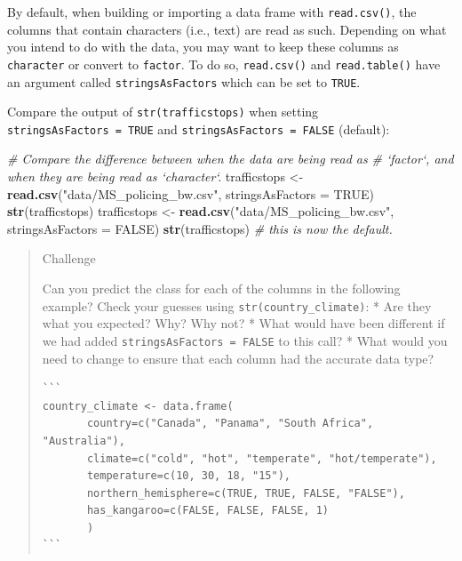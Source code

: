 \documentclass[
]{book}
\newenvironment{Shaded}{\begin{snugshade}}{\end{snugshade}}
\newcommand{\CommentTok}[1]{\textcolor[rgb]{0.56,0.35,0.01}{\textit{#1}}}
\newcommand{\DataTypeTok}[1]{\textcolor[rgb]{0.13,0.29,0.53}{#1}}
\newcommand{\KeywordTok}[1]{\textcolor[rgb]{0.13,0.29,0.53}{\textbf{#1}}}
\newcommand{\NormalTok}[1]{#1}
\newcommand{\OtherTok}[1]{\textcolor[rgb]{0.56,0.35,0.01}{#1}}
\newcommand{\StringTok}[1]{\textcolor[rgb]{0.31,0.60,0.02}{#1}}
\begin{document}
By default, when building or importing a data frame with \texttt{read.csv()}, the columns that contain characters (i.e., text) are read as such. Depending on what you intend to do with the data, you may want to keep these
columns as \texttt{character} or convert to \texttt{factor}. To do so, \texttt{read.csv()} and \texttt{read.table()} have an
argument called \texttt{stringsAsFactors} which can be set to \texttt{TRUE}.

Compare the output of \texttt{str(trafficstops)} when setting \texttt{stringsAsFactors\ =\ TRUE}
and \texttt{stringsAsFactors\ =\ FALSE} (default):

\begin{Shaded}
\begin{Highlighting}[]
\CommentTok{# Compare the difference between when the data are being read as}
\CommentTok{# `factor`, and when they are being read as `character`.}
\NormalTok{trafficstops <-}\StringTok{ }\KeywordTok{read.csv}\NormalTok{(}\StringTok{"data/MS_policing_bw.csv"}\NormalTok{, }\DataTypeTok{stringsAsFactors =} \OtherTok{TRUE}\NormalTok{)}
\KeywordTok{str}\NormalTok{(trafficstops)}
\NormalTok{trafficstops <-}\StringTok{ }\KeywordTok{read.csv}\NormalTok{(}\StringTok{"data/MS_policing_bw.csv"}\NormalTok{, }\DataTypeTok{stringsAsFactors =} \OtherTok{FALSE}\NormalTok{)}
\KeywordTok{str}\NormalTok{(trafficstops) }\CommentTok{# this is now the default.}
\end{Highlighting}
\end{Shaded}

\begin{quote}
Challenge

Can you predict the class for each of the columns in the following example?
Check your guesses using \texttt{str(country\_climate)}:
* Are they what you expected? Why? Why not?
* What would have been different if we had added \texttt{stringsAsFactors\ =\ FALSE} to this call?
* What would you need to change to ensure that each column had the accurate data type?

\begin{verbatim}
```
country_climate <- data.frame(
       country=c("Canada", "Panama", "South Africa", "Australia"),
       climate=c("cold", "hot", "temperate", "hot/temperate"),
       temperature=c(10, 30, 18, "15"),
       northern_hemisphere=c(TRUE, TRUE, FALSE, "FALSE"),
       has_kangaroo=c(FALSE, FALSE, FALSE, 1)
       )
```
\end{verbatim}
\end{quote}
\end{document}
